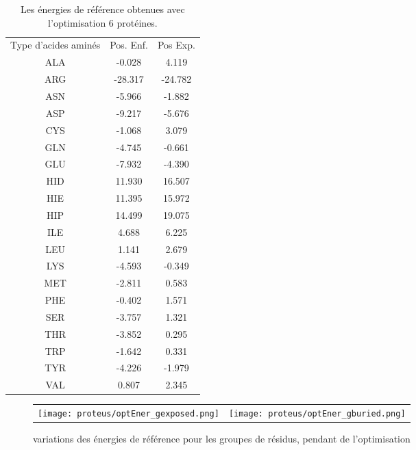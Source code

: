     \begin{table}[!htbp]
      \centering

      \begin{tabular}{ccc}

        \toprule
        Type d'acides aminés & Pos. Enf. & Pos Exp. \\
        \cmidrule{1-3}

        ALA &  -0.028  &  4.119     \\
        ARG &  -28.317 &  -24.782   \\
        ASN &  -5.966  &  -1.882    \\
        ASP &  -9.217  &  -5.676    \\
        CYS &  -1.068  &  3.079     \\
        GLN &  -4.745  &  -0.661    \\
        GLU &  -7.932  &  -4.390    \\
        HID &  11.930  &  16.507    \\
        HIE &  11.395  &  15.972    \\
        HIP &  14.499  &  19.075    \\
        ILE &  4.688   &  6.225     \\
        LEU &  1.141   &  2.679     \\
        LYS &  -4.593  &  -0.349    \\
        MET &  -2.811  &  0.583     \\
        PHE &  -0.402  &  1.571     \\
        SER &  -3.757  &  1.321     \\
        THR &  -3.852  &  0.295     \\
        TRP &  -1.642  &  0.331     \\
        TYR &  -4.226  &  -1.979    \\
        VAL &  0.807   &  2.345     \\

        \bottomrule


      \end{tabular}      
      \caption{Les énergies de référence obtenues avec l'optimisation 6 protéines.}
\label{tab:RefEner_groupes}      
    \end{table}

    \clearpage


   \begin{figure}[t]
     \centering
     \begin{tabular}{cc}
       \texttt{[image: proteus/optEner\_gexposed.png]} &
       \texttt{[image: proteus/optEner\_gburied.png]} \\
     \end{tabular}
     \caption{variations des énergies de référence pour les groupes de résidus, pendant de l'optimisation}
\label{graph:convEref}
   \end{figure}


